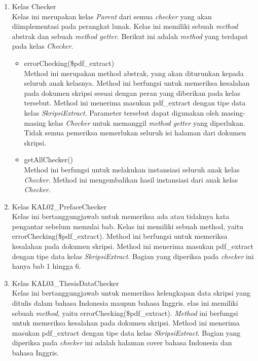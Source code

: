 \begin{enumerate}

	\item Kelas Checker \\
	Kelas ini merupakan kelas \textit{Parent} dari semua \textit{checker} yang akan diimplementasi pada perangkat lunak. Kelas ini memiliki sebuah \textit{method} abstrak dan sebuah \textit{method getter}. Berikut ini adalah \textit{method} yang terdapat pada kelas \textit{Checker}.
	
		\begin{itemize}
			\item errorChecking(\$pdf\_extract) \\
			Method ini merupakan method abstrak, yang akan diturunkan kepada seluruh anak kelasnya. Method ini berfungsi untuk memeriksa kesalahan pada dokumen skripsi sesuai dengan peran yang diberikan pada kelas tersebut. Method ini menerima masukan pdf\_extract dengan tipe data kelas \textit{SkripsiExtract}. Parameter tersebut dapat digunakan oleh masing-masing kelas \textit{Checker} untuk memanggil \textit{method getter} yang diperlukan. Tidak semua pemeriksa memerlukan seluruh isi halaman dari dokumen skripsi.			
			
			\item getAllChecker() \\
			Method ini berfungsi untuk melakukan instansiasi seluruh anak kelas \textit{Checker}. Method ini mengembalikan hasil instansiasi dari anak kelas \textit{Checker}.
		\end{itemize}
	
	\item Kelas KAL02\_PrefaceChecker \\
	Kelas ini bertanggungjawab untuk memeriksa ada atau tidaknya kata pengantar sebelum memulai bab. Kelas ini memiliki sebuah method, yaitu errorChecking(\$pdf\_extract). Method ini berfungsi untuk memeriksa kesalahan pada dokumen skripsi. Method ini menerima masukan pdf\_extract dengan tipe data kelas \textit{SkripsiExtract}. Bagian yang diperiksa pada \textit{checker} ini hanya bab 1 hingga 6.
	
	\item Kelas KAL03\_ThesisDataChecker \\
	Kelas ini bertanggungjawab untuk memeriksa kelengkapan data skripsi yang ditulis dalam bahasa Indonesia maupun bahasa Inggris. elas ini memiliki sebuah \textit{method}, yaitu errorChecking(\$pdf\_extract). \textit{Method} ini berfungsi untuk memeriksa kesalahan pada dokumen skripsi. Method ini menerima masukan pdf\_extract dengan tipe data kelas \textit{SkripsiExtract}. Bagian yang diperiksa pada \textit{checker} ini adalah halaman cover bahasa Indonesia dan bahasa Inggris.
		

\end{enumerate}
